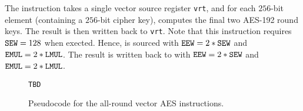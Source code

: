 The  instruction takes a single
vector source register {\tt vrt}, and for each $256$-bit element
(containing a $256$-bit cipher key),
computes the final two AES-192 round keys.
The result is then written back to {\tt vrt}.
Note that this instruction requires ${\tt SEW}=128$ when exected.
Hence, \vrt is sourced with ${\tt EEW}=2*{\tt SEW}$ and ${\tt EMUL}=2*{\tt LMUL}$.
The result is written back to \vrt with
${\tt EEW}=2*{\tt SEW}$ and ${\tt EMUL}=2*{\tt LMUL}$.


\begin{figure}[h]
\begin{lstlisting}[language=pseudo]
TBD
\end{lstlisting}
\caption{Pseudocode for the all-round vector AES instructions.}
\label{fig:pseudo:aes:vector:all-round}
\end{figure}

